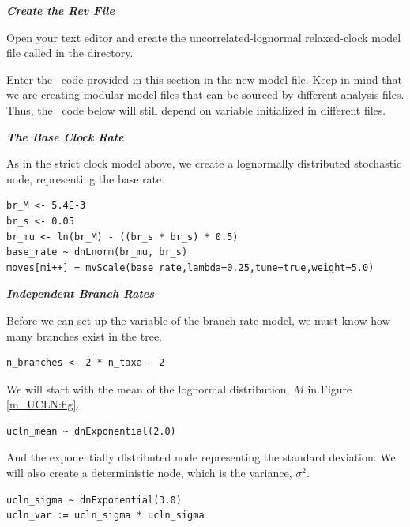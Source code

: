 \textbf{\textit{Create the Rev File}}

{\begin{framed}
Open your text editor and create the uncorrelated-lognormal relaxed-clock model file called {\textcolor{red}{}} in the  directory.

Enter the \Rev~code provided in this section in the new model file. Keep in mind that we are creating modular model files that can be sourced by different analysis files. Thus, the \Rev~code below will still depend on variable initialized in different files.
\end{framed}}


\textbf{\textit{The Base Clock Rate}}

As in the strict clock model above, we create a lognormally distributed stochastic node, representing the base rate.
{\tt \begin{snugshade*}
\begin{lstlisting}
br_M <- 5.4E-3
br_s <- 0.05
br_mu <- ln(br_M) - ((br_s * br_s) * 0.5)
base_rate ~ dnLnorm(br_mu, br_s)
moves[mi++] = mvScale(base_rate,lambda=0.25,tune=true,weight=5.0)
\end{lstlisting}
\end{snugshade*}}

\textbf{\textit{Independent Branch Rates}}

Before we can set up the variable of the branch-rate model, we must know how many branches exist in the tree.
{\tt \begin{snugshade*}
\begin{lstlisting}
n_branches <- 2 * n_taxa - 2
\end{lstlisting}
\end{snugshade*}}

We will start with the mean of the lognormal distribution, $M$ in Figure \ref{m_UCLN:fig}.
{\tt \begin{snugshade*}
\begin{lstlisting}
ucln_mean ~ dnExponential(2.0)
\end{lstlisting}
\end{snugshade*}}

And the exponentially distributed node representing the standard deviation.
We will also create a deterministic node, which is the variance, $\sigma^2$.
{\tt \begin{snugshade*}
\begin{lstlisting}
ucln_sigma ~ dnExponential(3.0)
ucln_var := ucln_sigma * ucln_sigma
\end{lstlisting}
\end{snugshade*}}

